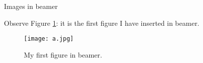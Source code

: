 
\begin{frame}{Images in beamer}

    Observe Figure \ref{fig:question}: it is the
    first figure I have inserted in beamer.
    
    \begin{figure}
    \centering
        \texttt{[image: a.jpg]}
        \caption{My first figure in beamer.}
        \label{fig:question}
    \end{figure}
    
\end{frame}